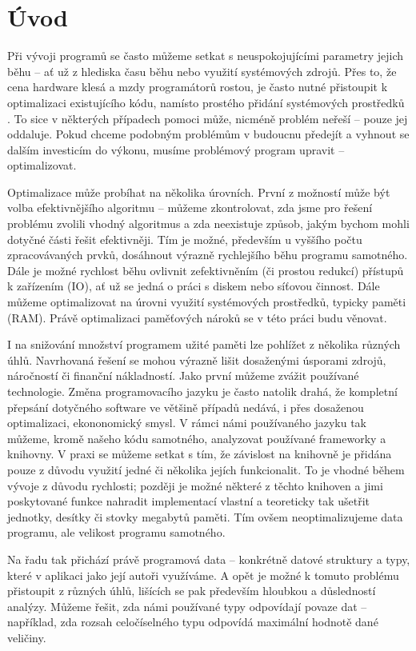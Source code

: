 \chapter{Úvod}
Při vývoji programů se často můžeme setkat s neuspokojujícími parametry jejich běhu -- ať už z hlediska času běhu nebo využití systémových zdrojů. Přes to, že cena hardware klesá a mzdy programátorů rostou, je často nutné přistoupit k optimalizaci existujícího kódu, namísto prostého přidání systémových prostředků \cite{mooreslaw}\cite{devsalary}. To sice v některých případech pomoci může, nicméně problém neřeší -- pouze jej oddaluje. Pokud chceme podobným problémům v budoucnu předejít a vyhnout se dalším investicím do výkonu, musíme problémový program upravit -- optimalizovat.

Optimalizace může probíhat na několika úrovních. První z možností může být volba efektivnějšího algoritmu -- můžeme zkontrolovat, zda jsme pro řešení problému zvolili vhodný algoritmus a zda neexistuje způsob, jakým bychom mohli dotyčné části řešit efektivněji. Tím je možné, především u vyššího počtu zpracovávaných prvků, dosáhnout výrazně rychlejšího běhu programu samotného. Dále je možné rychlost běhu ovlivnit zefektivněním (či prostou redukcí) přístupů k zařízením (IO), ať už se jedná o práci s diskem nebo síťovou činnost. Dále můžeme optimalizovat na úrovni využití systémových prostředků, typicky paměti (RAM). Právě optimalizaci paměťových nároků se v této práci budu věnovat.

I na snižování množství programem užité paměti lze pohlížet z několika různých úhlů. Navrhovaná řešení se mohou výrazně lišit dosaženými úsporami zdrojů, náročností či finanční nákladností. Jako první můžeme zvážit používané technologie. Změna programovacího jazyku je často natolik drahá, že kompletní přepsání dotyčného software ve většině případů nedává, i přes dosaženou optimalizaci, ekononomický smysl. V rámci námi používaného jazyku tak můžeme, kromě našeho kódu samotného, analyzovat používané frameworky a knihovny. V praxi se můžeme setkat s tím, že závislost na knihovně je přidána pouze z důvodu využití jedné či několika jejích funkcionalit. To je vhodné během vývoje z důvodu rychlosti; později je možné některé z těchto knihoven a jimi poskytované funkce nahradit implementací vlastní a teoreticky tak ušetřit jednotky, desítky či stovky megabytů paměti. Tím ovšem neoptimalizujeme data programu, ale velikost programu samotného.

Na řadu tak přichází právě programová data -- konkrétně datové struktury a typy, které v aplikaci jako její autoři využíváme. A opět je možné k tomuto problému přistoupit z různých úhlů, lišících se pak především hloubkou a důsledností analýzy. Můžeme řešit, zda námi používané typy odpovídají povaze dat -- například, zda rozsah celočíselného typu odpovídá maximální hodnotě dané veličiny.

